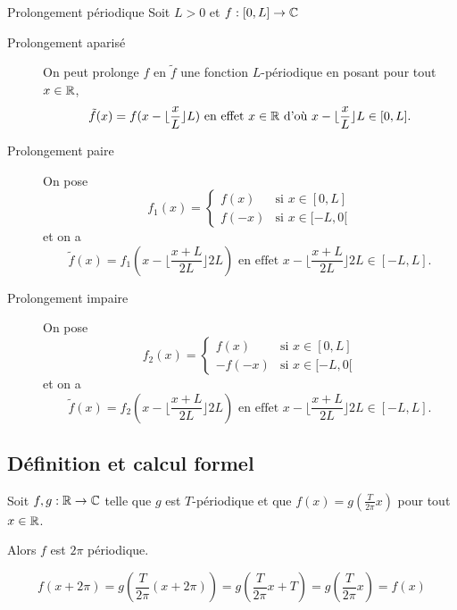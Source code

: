 \documentclass[a4paper, 12pt]{article}
\begin{document}
\begin{theoreme}{Prolongement périodique}{}
    Soit $L > 0$ et $f : [0, L] \to \mathbb{C}$

    \begin{description}
        \item[Prolongement aparisé] 
        On peut prolonge $f$ en $\tilde{f}$ une fonction $L$-périodique en posant pour tout $x \in \mathbb{R}$,
        $$
        \tilde{f}(x) = f(x - \lfloor \frac{x}{L} \rfloor L) \text{ en effet } x \in \mathbb{R} \text{ d'où } x - \lfloor \frac{x}{L} \rfloor L \in [0, L].
        $$

        \item[Prolongement paire]
        On pose
        $$
        f_1(x) = \begin{cases}
            f(x) & \text{si } x \in [0, L] \\
            f(-x) & \text{si } x \in [-L, 0[
        \end{cases}
        $$
        et on a
        $$
        \tilde{f}(x) = f_1(x - \lfloor \frac{x + L}{2L} \rfloor 2L) \text{ en effet } x - \lfloor \frac{x + L}{2L} \rfloor 2L \in [-L, L].
        $$

        \item[Prolongement impaire]
        On pose
        $$
        f_2(x) = \begin{cases}
            f(x) & \text{si } x \in [0, L] \\
            -f(-x) & \text{si } x \in [-L, 0[
        \end{cases}
        $$
        et on a
        $$
        \tilde{f}(x) = f_2(x - \lfloor \frac{x + L}{2L} \rfloor 2L) \text{ en effet } x - \lfloor \frac{x + L}{2L} \rfloor 2L \in [-L, L].
        $$
    \end{description}
\end{theoreme}

\subsection{Définition et calcul formel}

\begin{proposition}{}{}
    Soit $f, g : \mathbb{R} \to \mathbb{C}$ telle que $g$ est $T$-périodique et que $f(x) = g(\frac{T}{2\pi} x)$ pour tout $x \in \mathbb{R}$.

    Alors $f$ est $2\pi$ périodique.
\end{proposition}

\begin{demonstration}
    $$
    f(x + 2\pi) = g(\frac{T}{2\pi} (x + 2\pi)) = g(\frac{T}{2\pi} x + T) = g(\frac{T}{2\pi} x) = f(x)
    $$
\end{demonstration}
\end{document}
